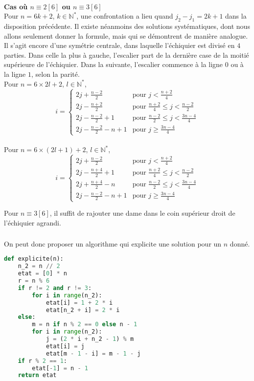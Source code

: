 \documentclass[a4paper]{article}
\begin{document}
\paragraph{}
\textbf{Cas où $n\equiv 2\left[6\right]$ ou $n\equiv 3\left[6\right] $}
\vspace{0.5em}\\
Pour $n=6k+2$, $k\in \mathbb{N}^{*}$, une confrontation a lieu quand $j_{2}-j_{1}=2k+1$ dans la disposition précédente. Il existe néanmoins des solutions systématiques, dont nous allons seulement donner la formule, mais qui se démontrent de manière analogue.
Il s'agit encore d'une symétrie centrale, dans laquelle l'échiquier est divisé en $4$ parties. Dans celle la plus à gauche, l'escalier part de la dernière case de la moitié supérieure de l'échiquier. Dans la suivante, l'escalier commence à la ligne $0$ ou à la ligne $1$, selon la parité.\\

Pour $n=6\times2l+2$, $l\in \mathbb{N}^{*}$,
\[i=\begin{cases}
2j+\frac{n-2}{2} & \text{pour } j<\frac{n+2}{4}\\
2j-\frac{n+2}{2} & \text{pour } \frac{n+2}{4}\leq j<\frac{n-2}{2}\\
2j-\frac{n-2}{2}+1 & \text{pour } \frac{n-2}{2}\leq j<\frac{3n-4}{4}\\
2j-\frac{n-2}{2}-n+1 & \text{pour } j \geq \frac{3n-4}{4}
\end{cases} \]\\

Pour $n=6\times(2l+1)+2$, $l\in \mathbb{N}^{*}$,
\[i=\begin{cases}
2j+\frac{n-2}{2} & \text{pour } j<\frac{n+2}{4}\\
2j-\frac{n+4}{2}+1 & \text{pour } \frac{n+2}{4}\leq j<\frac{n-2}{2}\\
2j+\frac{n+4}{2}-n & \text{pour } \frac{n-2}{2}\leq j<\frac{3n-4}{4}\\
2j-\frac{n-2}{2}-n+1 & \text{pour }j \geq \frac{3n-4}{4}
\end{cases} \]

Pour $n\equiv 3\left[6\right]$, il suffit de rajouter une dame dans le coin supérieur droit de l'échiquier agrandi.

\subparagraph{}
On peut donc proposer un algorithme qui explicite une solution pour un $n$ donné.

\begin{lstlisting}[language=Python,keywordstyle=\color{blue},stringstyle=\color{red},commentstyle=\color{green}]
def explicite(n):
	n_2 = n // 2
	etat = [0] * n
	r = n % 6
	if r != 2 and r != 3:
		for i in range(n_2):
			etat[i] = 1 + 2 * i
			etat[n_2 + i] = 2 * i
	else:
		m = n if n % 2 == 0 else n - 1
		for i in range(n_2):
			j = (2 * i + n_2 - 1) % m
			etat[i] = j
			etat[m - 1 - i] = m - 1 - j
	if r % 2 == 1:
		etat[-1] = n - 1
	return etat
\end{lstlisting}
\end{document}
